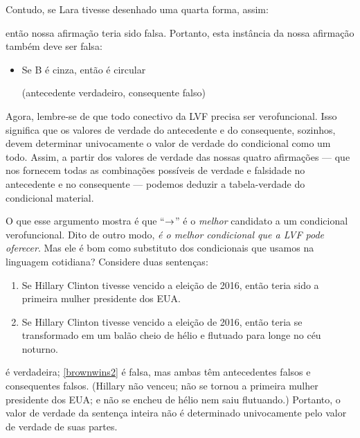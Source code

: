 Contudo, se Lara tivesse desenhado uma quarta forma, assim:
\begin{center}
\end{center}
então nossa afirmação teria sido falsa. Portanto, esta instância da nossa afirmação também deve ser falsa:
	\begin{itemize}
		\item Se B é cinza, então é circular

		\qquad (antecedente verdadeiro, consequente falso)
	\end{itemize}
Agora, lembre-se de que todo conectivo da LVF precisa ser verofuncional. Isso significa que os valores de verdade do antecedente e do consequente, sozinhos, devem determinar univocamente o valor de verdade do condicional como um todo. Assim, a partir dos valores de verdade das nossas quatro afirmações — que nos fornecem todas as combinações possíveis de verdade e falsidade no antecedente e no consequente — podemos deduzir a tabela-verdade do condicional material.

O que esse argumento mostra é que \textquotedblleft{}$\rightarrow$\textquotedblright{} é o \emph{melhor} candidato a um condicional verofuncional. Dito de outro modo, \emph{é o melhor condicional que a LVF pode oferecer}. Mas ele é bom como substituto dos condicionais que usamos na linguagem cotidiana? Considere duas sentenças:
	\begin{enumerate}
		\item\label{brownwins1} Se Hillary Clinton tivesse vencido a eleição de 2016, então teria sido a primeira mulher presidente dos EUA.
		\item\label{brownwins2} Se Hillary Clinton tivesse vencido a eleição de 2016, então teria se transformado em um balão cheio de hélio e flutuado para longe no céu noturno.
	\end{enumerate}
 é verdadeira; \cref*{brownwins2} é falsa, mas ambas têm antecedentes falsos e consequentes falsos. (Hillary não venceu; não se tornou a primeira mulher presidente dos EUA; e não se encheu de hélio nem saiu flutuando.) Portanto, o valor de verdade da sentença inteira não é determinado univocamente pelo valor de verdade de suas partes.

